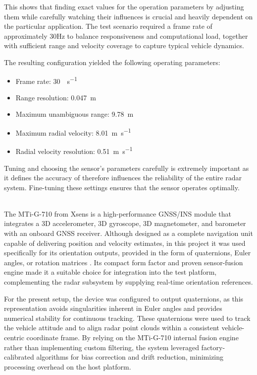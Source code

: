 This shows that finding exact values for the operation parameters by adjusting them while carefully watching their influences is crucial and heavily dependent on the particular application.
The test scenario required a frame rate of approximately 30Hz to balance responsiveness and computational load, together with sufficient range and velocity coverage to capture typical vehicle dynamics.

The resulting configuration yielded the following operating parameters:
\begin{itemize}
\item Frame rate: \SI{30}{\frame\per\second}
\item Range resolution: \SI{0.047}{\meter}
\item Maximum unambiguous range: \SI{9.78}{\meter}
\item Maximum radial velocity: \SI{8.01}{\meter\per\second}
\item Radial velocity resolution: \SI{0.51}{\meter\per\second}
\end{itemize}

Tuning and choosing the sensor's parameters carefully is extremely important as it defines the accuracy of therefore influences the reliability of the entire radar system.
Fine-tuning these settings ensures that the sensor operates optimally.

\hfill
\\
The MTi-G-710 from Xsens is a high-performance GNSS/INS module that integrates a 3D accelerometer, 3D gyroscope, 3D magnetometer, and barometer with an onboard GNSS receiver.  
Although designed as a complete navigation unit capable of delivering position and velocity estimates, in this project it was used specifically for its orientation outputs, provided in the form of quaternions, Euler angles, or rotation matrices \cite{mti710_manual}.  
Its compact form factor and proven sensor-fusion engine made it a suitable choice for integration into the test platform, complementing the radar subsystem by supplying real-time orientation references.  

For the present setup, the device was configured to output quaternions, as this representation avoids singularities inherent in Euler angles and provides numerical stability for continuous tracking.  
These quaternions were used to track the vehicle attitude and to align radar point clouds within a consistent vehicle-centric coordinate frame.  
By relying on the MTi-G-710 internal fusion engine rather than implementing custom filtering, the system leveraged factory-calibrated algorithms for bias correction and drift reduction, minimizing processing overhead on the host platform.  

